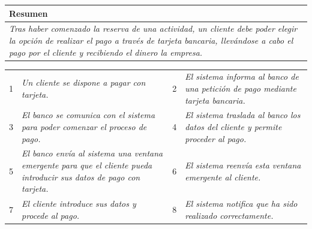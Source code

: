 \begin{table}[H]
    \begin{tabular}{llllllll}
\hline
\multicolumn{8}{|l|}{\cellcolor[HTML]{F2F2F2}Resumen}                                                                                                                                                                                                                                                                                                                                                                                             \\ \hline
\multicolumn{8}{|p{15cm}|}{{\color[HTML]{808080} \textit{Tras haber comenzado la reserva de una actividad, un cliente debe poder elegir la opción de realizar el pago a través de tarjeta bancaria, llevándose a cabo el pago por el cliente y recibiendo el dinero la empresa.}}} \\ \hline
\end{tabular}
\end{table}

\begin{table}[h!]
    \centering
    \begin{tabular}{|p{0.6cm}|p{6.5cm}|p{0.6cm}|p{6.5cm}|}
    \rowcolor{lightgray}
    \hline
    \multicolumn{4}{|l|}{Curso Normal (Básico)} \\
    \hline
    1 & \color[HTML]{808080}\textit{Un cliente se dispone a pagar con tarjeta.} & 2 & \color[HTML]{808080}\textit{El sistema informa al banco de una petición de pago mediante tarjeta bancaria.} \\
    \hline
    3 & \color[HTML]{808080}\textit{El banco se comunica con el sistema para poder comenzar el proceso de pago.} & 4 & \color[HTML]{808080}\textit{El sistema traslada al banco los datos del cliente y permite proceder al pago.} \\
    \hline
    5 & \color[HTML]{808080}\textit{El banco envía al sistema una ventana emergente para que el cliente pueda introducir sus datos de pago con tarjeta.} & 6 & \color[HTML]{808080}\textit{El sistema reenvía esta ventana emergente al cliente.} \\
    \hline
    7 & \color[HTML]{808080}\textit{El cliente introduce sus datos y procede al pago.} & 8 & \color[HTML]{808080}\textit{El sistema notifica que ha sido realizado correctamente.} \\
    \hline
    \end{tabular}
    \end{table}

